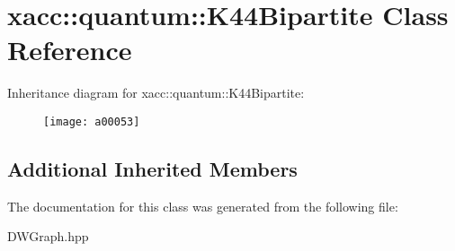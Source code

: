 \hypertarget{a00053}{}\section{xacc\+:\+:quantum\+:\+:K44\+Bipartite Class Reference}
\label{a00053}
Inheritance diagram for xacc\+:\+:quantum\+:\+:K44\+Bipartite\+:\begin{figure}[H]
\begin{center}
\leavevmode
\texttt{[image: a00053]}
\end{center}
\end{figure}
\subsection*{Additional Inherited Members}


The documentation for this class was generated from the following file\+:\begin{DoxyCompactItemize}
\item 
D\+W\+Graph.\+hpp\end{DoxyCompactItemize}
